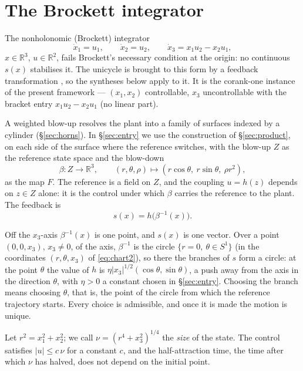 \documentclass[11pt,reqno]{amsart}
\theoremstyle{plain}
\theoremstyle{definition}
\theoremstyle{remark}
\newcommand{\R}{\mathbb{R}}
\begin{document}
\section{The Brockett integrator}\label{sec:brockett}
The nonholonomic (Brockett) integrator \cite{Brockett1983}
\begin{equation}\label{eq:brockett}
  \dot x_1=u_1,\qquad \dot x_2=u_2,\qquad \dot x_3=x_1u_2-x_2u_1,
\end{equation}
$x\in\R^{3}$, $u\in\R^{2}$, fails Brockett's necessary condition at the origin:
no continuous $s(x)$ stabilises it. The unicycle is brought to this form by a feedback transformation \cite{SontagSurvey1999}, so the syntheses below apply to it. It is the corank-one instance of the present
framework --- $(x_1,x_2)$ controllable, $x_3$ uncontrollable with the bracket
entry $x_1u_2-x_2u_1$ (no linear part).

A weighted blow-up resolves the plant into a
family of surfaces indexed by a cylinder (\S\ref{sec:horns}). In \S\ref{sec:entry}
we use the construction of \S\ref{sec:product}, on each side of the surface where the reference switches, with the
blow-up $Z$ as the reference state space and the blow-down
\[
  \beta\colon Z\to\R^{3},\qquad (r,\theta,\rho)\mapsto(r\cos\theta,\ r\sin\theta,\ \rho r^{2}),
\]
as the map $F$. The reference is a field on $Z$, and the coupling $u=h(z)$ depends on
$z\in Z$ alone: it is the control under which $\beta$ carries the reference to the plant.
The feedback is
\[
  s(x)=h\bigl(\beta^{-1}(x)\bigr).
\]

Off the $x_3$-axis $\beta^{-1}(x)$ is one point, and $s(x)$ is one vector. Over a point
$(0,0,x_3)$, $x_3\ne0$, of the axis, $\beta^{-1}$ is the circle $\{r=0,\ \theta\in S^{1}\}$ (in the coordinates
$(r,\theta,x_3)$ of \eqref{eq:chart2}), so there the branches of $s$ form a circle: at the point
$\theta$ the value of $h$ is $\eta|x_3|^{1/2}(\cos\theta,\sin\theta)$, a push away from the axis in the
direction $\theta$, with $\eta>0$ a constant chosen in \S\ref{sec:entry}. Choosing the branch means
choosing $\theta$, that is, the point of the circle from which the reference trajectory starts.
Every choice is admissible, and once it is made the motion is unique.

Let $r^{2}=x_1^{2}+x_2^{2}$; we call
$\nu=(r^{4}+x_3^{2})^{1/4}$ the \emph{size} of the state. The control satisfies $|u|\le c\,\nu$ for a constant $c$, and the half-attraction time, the
time after which $\nu$ has halved, does not depend on the initial point.
\end{document}
